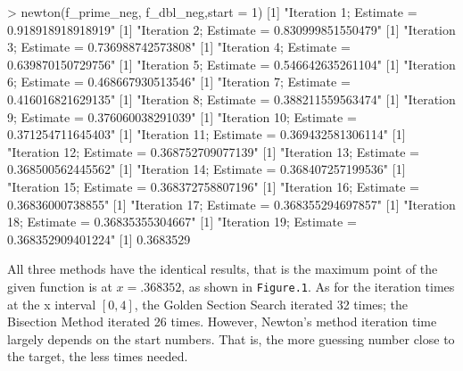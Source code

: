 \documentclass[
]{article}
\newenvironment{Shaded}{\begin{snugshade}}{\end{snugshade}}
\newcommand{\AttributeTok}[1]{\textcolor[rgb]{0.77,0.63,0.00}{#1}}
\newcommand{\DecValTok}[1]{\textcolor[rgb]{0.00,0.00,0.81}{#1}}
\newcommand{\FloatTok}[1]{\textcolor[rgb]{0.00,0.00,0.81}{#1}}
\newcommand{\FunctionTok}[1]{\textcolor[rgb]{0.00,0.00,0.00}{#1}}
\newcommand{\NormalTok}[1]{#1}
\newcommand{\SpecialCharTok}[1]{\textcolor[rgb]{0.00,0.00,0.00}{#1}}
\newcommand{\StringTok}[1]{\textcolor[rgb]{0.31,0.60,0.02}{#1}}
\begin{document}
\begin{Shaded}
\begin{Highlighting}[]
\SpecialCharTok{\textgreater{}} \FunctionTok{newton}\NormalTok{(f\_prime\_neg, f\_dbl\_neg,}\AttributeTok{start =} \DecValTok{1}\NormalTok{)}
\NormalTok{[}\DecValTok{1}\NormalTok{] }\StringTok{"Iteration 1; Estimate = 0.918918918918919"}
\NormalTok{[}\DecValTok{1}\NormalTok{] }\StringTok{"Iteration 2; Estimate = 0.830999851550479"}
\NormalTok{[}\DecValTok{1}\NormalTok{] }\StringTok{"Iteration 3; Estimate = 0.736988742573808"}
\NormalTok{[}\DecValTok{1}\NormalTok{] }\StringTok{"Iteration 4; Estimate = 0.639870150729756"}
\NormalTok{[}\DecValTok{1}\NormalTok{] }\StringTok{"Iteration 5; Estimate = 0.546642635261104"}
\NormalTok{[}\DecValTok{1}\NormalTok{] }\StringTok{"Iteration 6; Estimate = 0.468667930513546"}
\NormalTok{[}\DecValTok{1}\NormalTok{] }\StringTok{"Iteration 7; Estimate = 0.416016821629135"}
\NormalTok{[}\DecValTok{1}\NormalTok{] }\StringTok{"Iteration 8; Estimate = 0.388211559563474"}
\NormalTok{[}\DecValTok{1}\NormalTok{] }\StringTok{"Iteration 9; Estimate = 0.376060038291039"}
\NormalTok{[}\DecValTok{1}\NormalTok{] }\StringTok{"Iteration 10; Estimate = 0.371254711645403"}
\NormalTok{[}\DecValTok{1}\NormalTok{] }\StringTok{"Iteration 11; Estimate = 0.369432581306114"}
\NormalTok{[}\DecValTok{1}\NormalTok{] }\StringTok{"Iteration 12; Estimate = 0.368752709077139"}
\NormalTok{[}\DecValTok{1}\NormalTok{] }\StringTok{"Iteration 13; Estimate = 0.368500562445562"}
\NormalTok{[}\DecValTok{1}\NormalTok{] }\StringTok{"Iteration 14; Estimate = 0.368407257199536"}
\NormalTok{[}\DecValTok{1}\NormalTok{] }\StringTok{"Iteration 15; Estimate = 0.368372758807196"}
\NormalTok{[}\DecValTok{1}\NormalTok{] }\StringTok{"Iteration 16; Estimate = 0.36836000738855"}
\NormalTok{[}\DecValTok{1}\NormalTok{] }\StringTok{"Iteration 17; Estimate = 0.368355294697857"}
\NormalTok{[}\DecValTok{1}\NormalTok{] }\StringTok{"Iteration 18; Estimate = 0.36835355304667"}
\NormalTok{[}\DecValTok{1}\NormalTok{] }\StringTok{"Iteration 19; Estimate = 0.368352909401224"}
\NormalTok{[}\DecValTok{1}\NormalTok{] }\FloatTok{0.3683529}
\end{Highlighting}
\end{Shaded}

All three methods have the identical results, that is the maximum point
of the given function is at \(x=.368352\), as shown in
\texttt{Figure.1}. As for the iteration times at the x interval
\([0,4]\), the Golden Section Search iterated 32 times; the Bisection
Method iterated 26 times. However, Newton's method iteration time
largely depends on the start numbers. That is, the more guessing number
close to the target, the less times needed.
\end{document}
